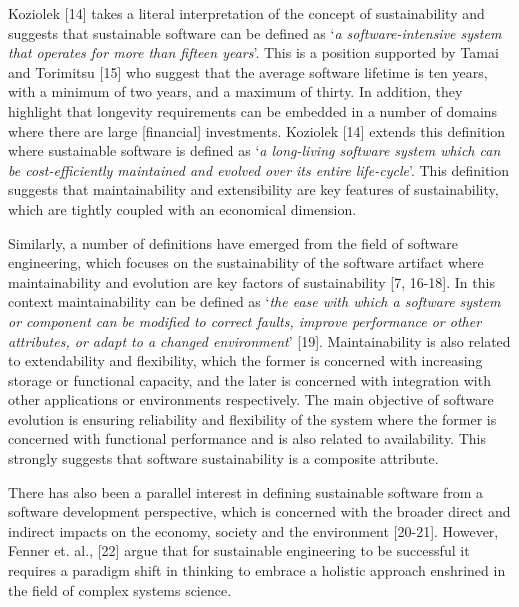\documentclass[preprint,12pt,authoryear]{elsarticle}
\begin{document}
Koziolek [14] takes a literal interpretation of the concept of
sustainability and suggests that sustainable software can be defined
as `{\emph{a software-intensive system that operates for more than
fifteen years}}'. This is a position supported by Tamai and Torimitsu
[15] who suggest that the average software lifetime is ten years, with
a minimum of two years, and a maximum of thirty. In addition, they
highlight that longevity requirements can be embedded in a number of
domains where there are large [financial] investments. Koziolek [14]
extends this definition where sustainable software is defined as
`{\emph{a long-living software system which can be cost-efficiently
maintained and evolved over its entire life-cycle}}'. This definition
suggests that maintainability and extensibility are key features of
sustainability, which are tightly coupled with an economical
dimension.

Similarly, a number of definitions have emerged from the field of
software engineering, which focuses on the sustainability of the
software artifact where maintainability and evolution are key factors
of sustainability [7, 16-18]. In this context maintainability can be
defined as `{\emph{the ease with which a software system or component
can be modified to correct faults, improve performance or other
attributes, or adapt to a changed environment}}' [19]. Maintainability
is also related to extendability and flexibility, which the former is
concerned with increasing storage or functional capacity, and the
later is concerned with integration with other applications or
environments respectively. The main objective of software evolution is
ensuring reliability and flexibility of the system where the former is
concerned with functional performance and is also related to
availability. This strongly suggests that software sustainability is a
composite attribute.

There has also been a parallel interest in defining sustainable
software from a software development perspective, which is concerned
with the broader direct and indirect impacts on the economy, society
and the environment [20-21]. However, Fenner et. al., [22] argue that
for sustainable engineering to be successful it requires a paradigm
shift in thinking to embrace a holistic approach enshrined in the
field of complex systems science.
\end{document}
